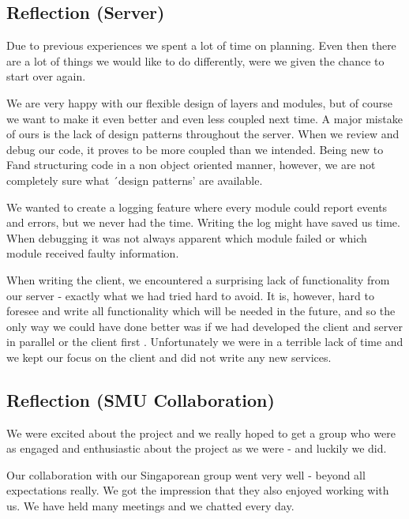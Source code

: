 \subsection{Reflection (Server)}
Due to previous experiences we spent a lot of time on planning. Even then there are a lot of things we would like to do differently, were we given the chance to start over again.

We are very happy with our flexible design of layers and modules, but of course we want to make it even better and even less coupled next time. A major mistake of ours is the lack of design patterns throughout the server. When we review and debug our code, it proves to be more coupled than we intended. Being new to F\Sh and structuring code in a non object oriented manner, however, we are not completely sure what ´design patterns' are available.

We wanted to create a logging feature where every module could report events and errors, but we never had the time. Writing the log might have saved us time. When debugging it was not always apparent which module failed or which module received faulty information. 

When writing the client, we encountered a surprising lack of functionality from our server - exactly what we had tried hard to avoid. It is, however, hard to foresee and write all functionality which will be needed in the future, and so the only way we could have done better was if we had developed the client and server in parallel or the client first .
Unfortunately we were in a terrible lack of time and we kept our focus on the client and did not write any new services.

\subsection{Reflection (SMU Collaboration)}
We were excited about the project and we really hoped to get a group who were as engaged and enthusiastic about the project as we were - and luckily we did.

Our collaboration with our Singaporean group went very well - beyond all expectations really. We got the impression that they also enjoyed working with us. We have held many meetings and we chatted every day.

\newpage